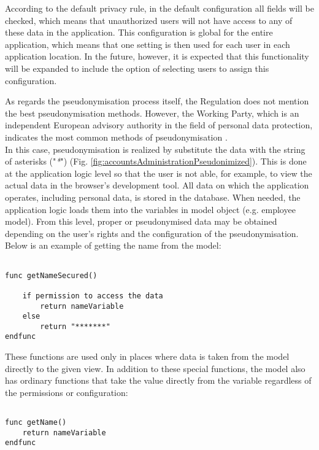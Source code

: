 \documentclass[en, noamssymb]{mgr}
\begin{document}
According to the default privacy rule, in the default configuration all fields will be checked, which means that unauthorized users will not have access to any of these data in the application. This configuration is global for the entire application, which means that one setting is then used for each user in each application location. In the future, however, it is expected that this functionality will be expanded to include the option of selecting users to assign this configuration.

\indent As regards the pseudonymisation process itself, the Regulation does not mention the best pseudonymisation methods. However, the Working Party, which is an independent European advisory authority in the field of personal data protection, indicates the most common methods of pseudonymisation \cite{pseudonimizacja_2017}.\\
\indent  In this case, pseudonymisation is realized by substitute the data with the string of asterisks ("\textit{*}") (Fig. \ref{fig:accountsAdministrationPseudonimized}). This is done at the application logic level so that the user is not able, for example, to view the actual data in the browser's development tool. All data on which the application operates, including personal data, is stored in the database. When needed, the application logic loads them into the variables in model object (e.g. employee model). From this level, proper or pseudonymised data may be obtained depending on the user's rights and the configuration of the pseudonymisation. 
Below is an example of getting the name from the model:

\begin{minipage}{\linewidth}
\begin{lstlisting}
 
func getNameSecured()

	if permission to access the data
		return nameVariable
	else
		return "*******"
endfunc 

\end{lstlisting}
\end{minipage}

These functions are used only in places where data is taken from the model directly to the given view. In addition to these special functions, the model also has ordinary functions that take the value directly from the variable regardless of the permissions or configuration: 

\begin{minipage}{\linewidth}
\begin{lstlisting}
 
func getName()
	return nameVariable
endfunc 

\end{lstlisting}
\end{minipage}
\end{document}
